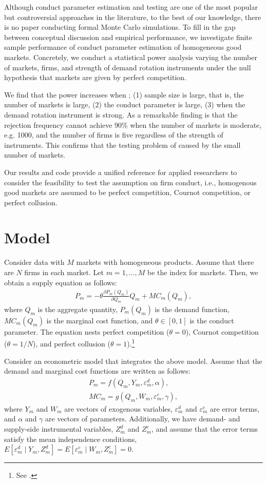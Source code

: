 \documentclass[11pt, a4paper]{article}
\begin{document}
Although conduct parameter estimation and testing are one of the most popular but controversial approaches in the literature, to the best of our knowledge, there is no paper conducting formal Monte Carlo simulations. 
To fill in the gap between conceptual discussion and empirical performance, we investigate finite sample performance of conduct parameter estimation of homogeneous good markets. 
Concretely, we conduct a statistical power analysis varying the number of markets, firms, and strength of demand rotation instruments under the null hypothesis that markets are given by perfect competition.

We find that the power increases when ; (1) sample size is large, that is, the number of markets is large, (2) the conduct parameter is large, (3) when the demand rotation instrument is strong. 
As a remarkable finding is that the rejection frequency cannot achieve 90\% when the number of markets is moderate, e.g. 1000, and the number of firms is five regardless of the strength of instruments. 
This confirms that the testing problem 
 of \cite{genesove1998testing} caused by the small number of markets.

Our results and code provide a unified reference for applied researchers to consider the feasibility to test the assumption on firm conduct, i.e., homogenous good markets are assumed to be perfect competition, Cournot competition, or perfect collusion.

\section{Model}
Consider data with $M$ markets with homogeneous products.
Assume that there are $N$ firms in each market.
Let $m = 1,\ldots, M$ be the index for markets.
Then, we obtain a supply equation as follows:
\begin{align}
     P_m = -\theta\frac{\partial P_m(Q_{m})}{\partial Q_{m}}Q_{m} + MC_m(Q_{m}),\label{eq:supply_equation}
\end{align}
where $Q_{m}$ is the aggregate quantity, $P_m(Q_{m})$ is the demand function, $MC_{m}(Q_{m})$ is the marginal cost function, and $\theta\in[0,1]$ is  the conduct parameter. 
The equation nests perfect competition ($\theta=0$), Cournot competition ($\theta=1/N$), and perfect collusion ($\theta=1$).\footnote{See \cite{bresnahan1982oligopoly}.} 

Consider an econometric model that integrates the above model.
Assume that the demand and marginal cost functions are written as follows: 
\begin{align}
    P_m = f(Q_{m}, Y_m, \varepsilon^{d}_{m}, \alpha), \label{eq:demand}\\
    MC_m = g(Q_{m}, W_{m}, \varepsilon^{c}_{m}, \gamma),\label{eq:marginal_cost}
\end{align}
where $Y_m$ and $W_{m}$ are vectors of exogenous variables, $\varepsilon^{d}_{m}$ and $\varepsilon^{c}_{m}$ are error terms, and $\alpha$ and $\gamma$ are vectors of parameters.
Additionally, we have demand- and supply-side instrumental variables, $Z^{d}_{m}$ and $Z^{c}_{m}$, and assume that the error terms satisfy the mean independence conditions, $E[\varepsilon^{d}_{m}\mid Y_m, Z^{d}_{m}] = E[\varepsilon^{c}_{m} \mid W_{m}, Z^{c}_{m}] =0$.
\end{document}
